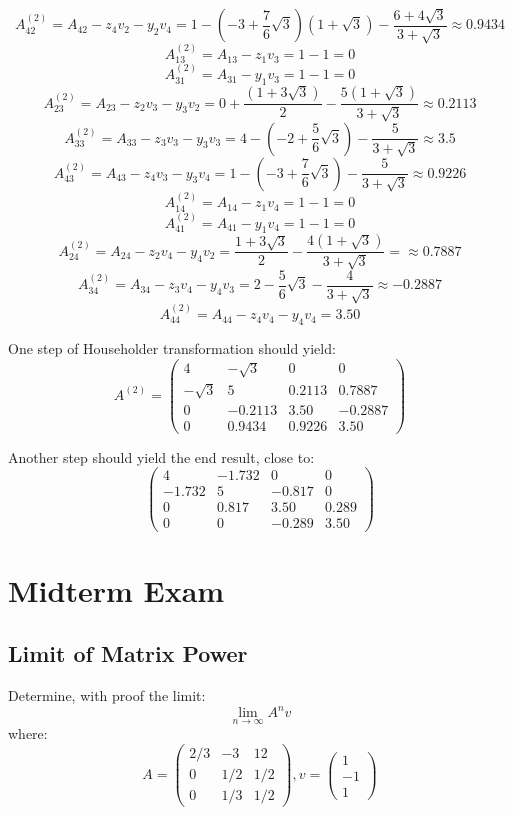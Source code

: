 \documentclass[12pt]{article} %
\newcommand{\ntoinf}[1]{\lim_{{#1}\rightarrow \infty}}
\newcommand{\1}[1]{\mathds{1}\left[#1\right]}
\begin{document}
$$
	A_{42}^{(2)}=A_{42} - z_4v_2 - y_2v_4 =1-(-3+\frac{7}{6}\sqrt{3})(1+\sqrt{3}) - \frac{6+4\sqrt{3}}{3+\sqrt{3}}\approx 0.9434
$$
$$
	A_{13}^{(2)} = A_{13} - z_1v_3 = 1-1=0
$$
$$
	A_{31}^{(2)} = A_{31} - y_1v_3 = 1-1=0
$$
$$
	A_{23}^{(2)} = A_{23} - z_2v_3 - y_3v_2 = 0+\frac{(1+3\sqrt{3})}{2}-\frac{5(1+\sqrt{3})}{3+\sqrt{3}} \approx 0.2113
$$
$$
	A_{33}^{(2)} = A_{33} - z_3v_3 - y_3v_3 = 4-(-2+\frac56\sqrt{3}) - \frac{5}{3+\sqrt{3}} \approx 3.5
$$
$$
	A_{43}^{(2)} = A_{43} - z_4v_3 - y_3v_4 = 1-(-3+\frac76\sqrt{3}) - \frac{5}{3+\sqrt{3}} \approx 0.9226
$$
$$
	A_{14}^{(2)} = A_{14} - z_1v_4 = 1-1=0
$$
$$
	A_{41}^{(2)} = A_{41} - y_1v_4 = 1-1=0
$$
$$
	A_{24}^{(2)} = A_{24} - z_2v_4 - y_4v_2 = \frac{1+3\sqrt{3}}{2} - \frac{4(1+\sqrt{3})}{3+\sqrt{3}} = \approx 0.7887
$$
$$
	A_{34}^{(2)} = A_{34} - z_3v_4 - y_4v_3 = 2-\frac56\sqrt{3} - \frac{4}{3+\sqrt{3}}\approx -0.2887
$$
$$
	A_{44}^{(2)} = A_{44} - z_4v_4 - y_4v_4 = 3.50
$$

One step of Householder transformation should yield:
$$
	A^{(2)} = 
	\begin{pmatrix}
		4 & -\sqrt{3} & 0 & 0 \\
		-\sqrt{3} & 5 & 0.2113 & 0.7887 \\
		0 & -0.2113 & 3.50 & -0.2887 \\
		0 & 0.9434& 0.9226 & 3.50
	\end{pmatrix}
$$


Another step should yield the end result, close to:
$$
	\begin{pmatrix}
		4&   -1.732&   0&   0\\
		-1.732 & 5 & -0.817 & 0\\
		0 & 0.817 & 3.50 & 0.289\\
		0 & 0 & -0.289 & 3.50
	\end{pmatrix}
$$

\newpage
\section{Midterm Exam}
\subsection{Limit of Matrix Power}
Determine, with proof the limit:
$$
	\ntoinf{n}A^nv
$$ where:
$$
	A = 
	\begin{pmatrix}
		2/3 & -3 & 12\\
		0 & 1/2 & 1/2\\
		0 & 1/3 & 1/2
	\end{pmatrix}, 
	v = 
	\begin{pmatrix}
		1 \\
		-1\\
		1
	\end{pmatrix}
$$
\end{document}
